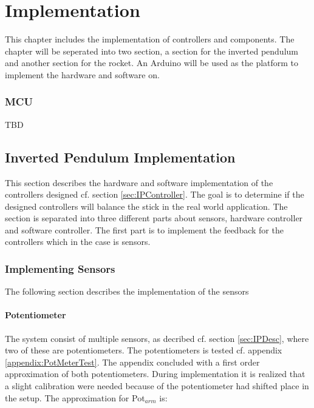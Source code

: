 \chapter{Implementation}
This chapter includes the implementation of controllers and components. The chapter will be seperated into two section, a section for the inverted pendulum and another section for the rocket. An Arduino will be used as the platform to implement the hardware and software on.    


\subsection{MCU}\label{sec:MCU}
TBD


\section{Inverted Pendulum Implementation}
This section describes the hardware and software implementation of the controllers designed cf. section \ref{sec:IPController}. The goal is to determine if the designed controllers will balance the stick in the real world application. The section is separated into three different parts about sensors, hardware controller and software controller. The first part is to implement the feedback for the controllers which in the case is sensors. 

\subsection{Implementing Sensors}
The following section describes the implementation of the sensors   


\subsubsection*{Potentiometer}\label{section:PotmeterImplementation}
The system consist of multiple sensors, as decribed cf. section \ref{sec:IPDesc}, where two of these are potentiometers. The potentiometers is tested cf. appendix \ref{appendix:PotMeterTest}. The appendix concluded with a first order approximation of both potentiometers. During implementation it is realized that a slight calibration were needed because of the potentiometer had shifted place in the setup. The approximation for Pot$_{arm}$ is:

